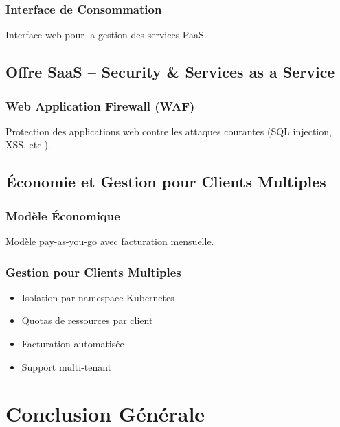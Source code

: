 \documentclass[12pt,a4paper,twoside]{report}
\begin{document}
\subsection{Interface de Consommation}

Interface web pour la gestion des services PaaS.

\section{Offre SaaS – Security \& Services as a Service}

\subsection{Web Application Firewall (WAF)}

Protection des applications web contre les attaques courantes (SQL injection, XSS, etc.).

\section{Économie et Gestion pour Clients Multiples}

\subsection{Modèle Économique}

Modèle pay-as-you-go avec facturation mensuelle.

\subsection{Gestion pour Clients Multiples}

\begin{itemize}
    \item Isolation par namespace Kubernetes
    \item Quotas de ressources par client
    \item Facturation automatisée
    \item Support multi-tenant
\end{itemize}

\newpage

\chapter*{Conclusion Générale}
\end{document}
